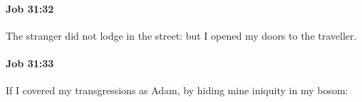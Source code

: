 		\paragraph{Job 31:32} %
			\label{JOB-31-32}

			The stranger did not lodge in the street: but I opened my doors to the traveller.


		\paragraph{Job 31:33} %
			\label{JOB-31-33}

			If I covered my transgressions as Adam, by hiding mine iniquity in my bosom:


